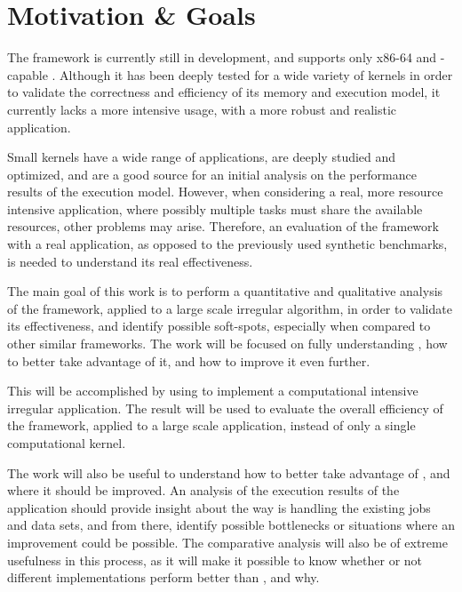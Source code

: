 \documentclass[main.tex]{subfiles}
\begin{document}
\section{Motivation \& Goals}


The \gama framework is currently still in development, and supports only x86-64 \cpus and \cuda-capable \gpus. Although it has been deeply tested for a wide variety of kernels in order to validate the correctness and efficiency of its memory and execution model, it currently lacks a more intensive usage, with a more robust and realistic application.

Small kernels have a wide range of applications, are deeply studied and optimized, and are a good source for an initial analysis on the performance results of the execution model. However, when considering a real, more resource intensive application, where possibly multiple tasks must share the available resources, other problems may arise. Therefore, an evaluation of the framework with a real application, as opposed to the previously used synthetic benchmarks, is needed to understand its real effectiveness.

The main goal of this work is to perform a quantitative and qualitative analysis of the \gama framework, applied to a large scale irregular algorithm, in order to validate its effectiveness, and identify possible soft-spots, especially when compared to other similar frameworks. The work will be focused on fully understanding \gama, how to better take advantage of it, and how to improve it even further.

This will be accomplished by using \gama to implement a computational intensive irregular application. The result will be used to evaluate the overall efficiency of the \gama framework, applied to a large scale application, instead of only a single computational kernel.

The work will also be useful to understand how to better take advantage of \gama, and where it should be improved. An analysis of the execution results of the application should provide insight about the way \gama is handling the existing jobs and data sets, and from there, identify possible bottlenecks or situations where an improvement could be possible. The comparative analysis will also be of extreme usefulness in this process, as it will make it possible to know whether or not different implementations perform better than \gama, and why.
\end{document}
